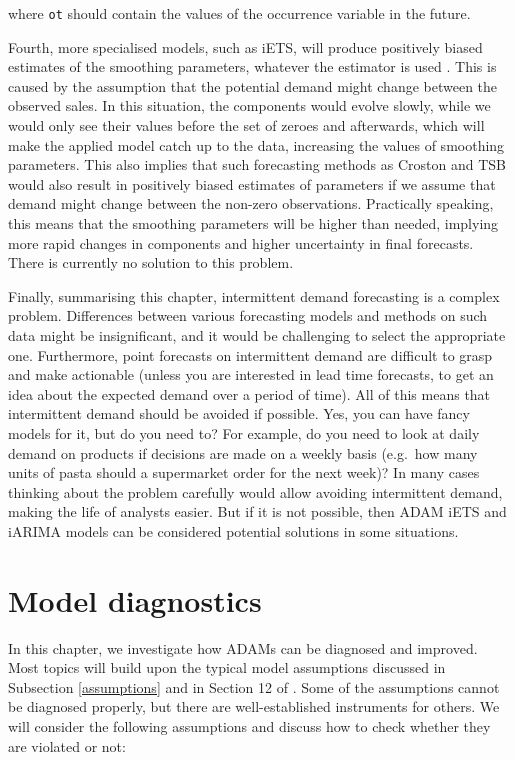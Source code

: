 \documentclass[
]{book}
\theoremstyle{definition}
\theoremstyle{definition}
\theoremstyle{definition}
\theoremstyle{definition}
\theoremstyle{remark}
\begin{document}
where \texttt{ot} should contain the values of the occurrence variable in the future.

Fourth, more specialised models, such as iETS, will produce positively biased estimates of the smoothing parameters, whatever the estimator is used \citep[see explanation in][]{Svetunkov2019a}. This is caused by the assumption that the potential demand might change between the observed sales. In this situation, the components would evolve slowly, while we would only see their values before the set of zeroes and afterwards, which will make the applied model catch up to the data, increasing the values of smoothing parameters. This also implies that such forecasting methods as Croston \citep{Croston1972} and TSB \citep{Teunter2011} would also result in positively biased estimates of parameters if we assume that demand might change between the non-zero observations. Practically speaking, this means that the smoothing parameters will be higher than needed, implying more rapid changes in components and higher uncertainty in final forecasts. There is currently no solution to this problem.

Finally, summarising this chapter, intermittent demand forecasting is a complex problem. Differences between various forecasting models and methods on such data might be insignificant, and it would be challenging to select the appropriate one. Furthermore, point forecasts on intermittent demand are difficult to grasp and make actionable (unless you are interested in lead time forecasts, to get an idea about the expected demand over a period of time). All of this means that intermittent demand should be avoided if possible. Yes, you can have fancy models for it, but do you need to? For example, do you need to look at daily demand on products if decisions are made on a weekly basis (e.g.~how many units of pasta should a supermarket order for the next week)? In many cases thinking about the problem carefully would allow avoiding intermittent demand, making the life of analysts easier. But if it is not possible, then ADAM iETS and iARIMA models can be considered potential solutions in some situations.

\hypertarget{diagnostics}{%
\chapter{Model diagnostics}\label{diagnostics}}

In this chapter, we investigate how ADAMs can be diagnosed and improved. Most topics will build upon the typical model assumptions discussed in Subsection \ref{assumptions} and in Section 12 of \citet{SvetunkovSBA}. Some of the assumptions cannot be diagnosed properly, but there are well-established instruments for others. We will consider the following assumptions and discuss how to check whether they are violated or not:
\end{document}
